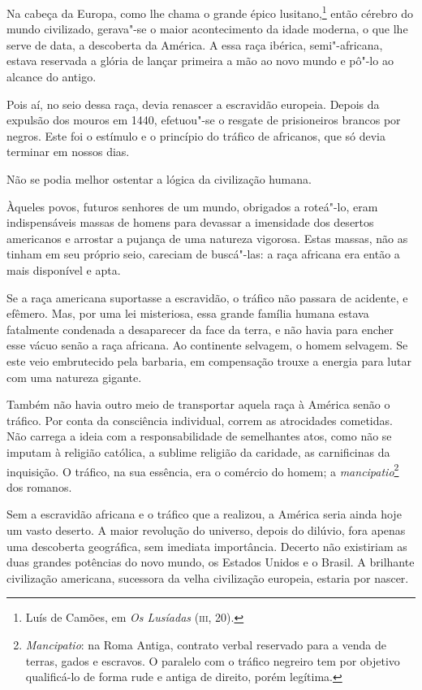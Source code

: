 \begin{linenumbers}
Na cabeça da Europa, como lhe chama o grande épico
lusitano,\footnote{Luís de Camões, em \textit{Os Lusíadas} (\textsc{iii}, 20).}
 então cérebro do mundo civilizado, gerava"-se o maior acontecimento da
idade moderna, o que lhe serve de data, a descoberta da América. A essa
raça ibérica, semi"-africana, estava reservada a glória de lançar
primeira a mão ao novo mundo e pô"-lo ao alcance do antigo. 

Pois aí, no seio dessa raça, devia renascer a escravidão europeia.
Depois da expulsão dos mouros em 1440, efetuou"-se o resgate de
prisioneiros brancos por negros. Este foi o estímulo e o princípio do
tráfico de africanos, que só devia terminar em nossos dias. 

Não se podia melhor ostentar a lógica da civilização humana.

Àqueles povos, futuros senhores de um mundo, obrigados a roteá"-lo,
eram indispensáveis massas de homens para devassar a imensidade dos
desertos americanos e arrostar a pujança de uma natureza vigorosa.
Estas massas, não as tinham em seu próprio seio, careciam de
buscá"-las: a raça africana era então a mais disponível e apta. 

Se a raça americana suportasse a escravidão, o tráfico não passara de \label{racaamericana}
acidente, e efêmero. Mas, por uma lei misteriosa, essa grande família
humana estava fatalmente condenada a desaparecer da face da terra, e
não havia para encher esse vácuo senão a raça africana. Ao continente
selvagem, o homem selvagem. Se este veio embrutecido pela barbaria, em
compensação trouxe a energia para lutar com uma natureza gigante. 

Também não havia outro meio de transportar aquela raça à América senão o
tráfico. Por conta da consciência individual, correm as atrocidades
cometidas. Não carrega a ideia com a responsabilidade de semelhantes
atos, como não se imputam à religião católica, a sublime religião da
caridade, as carnificinas da inquisição. O tráfico, na sua essência,
era o comércio do homem; a
\textit{mancipatio}\footnote{ \textit{Mancipatio}: na Roma Antiga, contrato verbal 
reservado para a venda de terras, gados e escravos. O paralelo com o tráfico negreiro 
tem por objetivo qualificá-lo de forma rude e antiga de direito, porém legítima.} dos romanos. 

Sem a escravidão africana e o tráfico que a realizou, a América seria
ainda hoje um vasto deserto. A maior revolução do universo, depois do
dilúvio, fora apenas uma descoberta geográfica, sem imediata
importância. Decerto não existiriam as duas grandes potências do novo
mundo, os Estados Unidos e o Brasil. A brilhante civilização americana,
sucessora da velha civilização europeia, estaria por nascer. 

\end{linenumbers}


